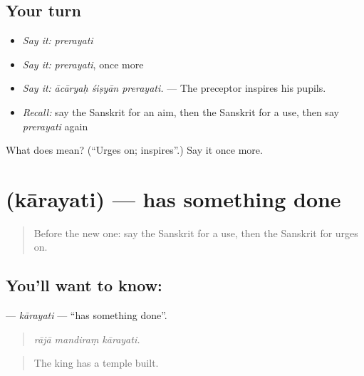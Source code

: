 \subsection*{Your turn}
\begin{itemize}
\raggedright
  \item \emph{Say it:} \emph{prerayati}
  \item \emph{Say it:} \emph{prerayati}, once more
  \item \emph{Say it:} \emph{ācāryaḥ śiṣyān prerayati.} — The preceptor inspires his pupils.
  \item \emph{Recall:} say the Sanskrit for an aim, then the Sanskrit for a use, then say \emph{prerayati} again
\end{itemize}

\begin{tcolorbox}[breakable,colback=teal!4,colframe=teal!35!black,title={Before you move on}]
What does  mean? (\textquotedblleft{}Urges on; inspires\textquotedblright{}.) Say it once more.
\end{tcolorbox}
\section[\texorpdfstring{\sk{कारयति} (kārayati)}{कारयति (kārayati)}]{ (kārayati) — has something done}

\label{lesson:SA-C341-karayati}



\begin{quote}
Before the new one: say the Sanskrit for a use, then the Sanskrit for urges on.
\end{quote}

\subsection*{You'll want to know: }
\textbf{} — \emph{kārayati} — \textquotedblleft{}has something done\textquotedblright{}.

\begin{quote}
  
\end{quote}

\begin{quote}
\emph{rājā mandiraṃ kārayati.}
\end{quote}

\begin{quote}
The king has a temple built.
\end{quote}

